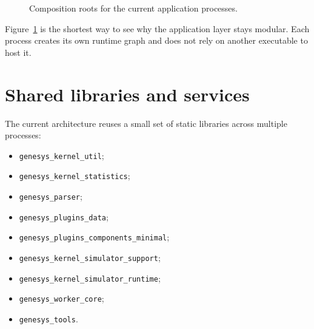 \begin{figure}[htbp]
\centering
\caption{Composition roots for the current application processes.}
\label{fig:application-architecture-composition-roots}
\end{figure}

Figure~\ref{fig:application-architecture-composition-roots} is the shortest way
to see why the application layer stays modular. Each process creates its own
runtime graph and does not rely on another executable to host it.

\section{Shared libraries and services}
\label{sec:application-architecture-shared-libraries}

The current architecture reuses a small set of static libraries across
multiple processes:
\begin{itemize}
\item \texttt{genesys\_kernel\_util};
\item \texttt{genesys\_kernel\_statistics};
\item \texttt{genesys\_parser};
\item \texttt{genesys\_plugins\_data};
\item \texttt{genesys\_plugins\_components\_minimal};
\item \texttt{genesys\_kernel\_simulator\_support};
\item \texttt{genesys\_kernel\_simulator\_runtime};
\item \texttt{genesys\_worker\_core};
\item \texttt{genesys\_tools}.
\end{itemize}

